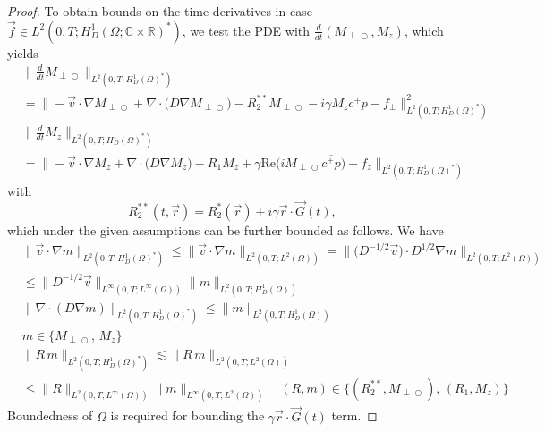 \documentclass{ws-m3as}
\renewcommand\Re{\mathrm{Re}}
\def\Mpp{M_{\perp\!\!\!\!\!\bigcirc}}
\newcommand{\revision}[1]{{ #1}}
\newcommand{\Margin}[1]{}
\begin{document}
\begin{proof}
To obtain bounds on the time derivatives in case $\revision{\vec{f}}\in L^2(0,T;H_D^1(\Omega;\mathbb{C}\times\mathbb{R})^*)$, we test the PDE with $\frac{d}{dt}(\Mpp,M_z)$, which yields
\[
\begin{aligned}
&\|\frac{d}{dt}\Mpp\|_{L^2(0,T;H_D^1(\Omega)^*)}\\
&=\|-{\vec v}\cdot\nabla \Mpp +\nabla\cdot\bigl(D \nabla \Mpp\bigr) 
-R_2^{**}\Mpp-i\gamma M_zc^+p-f_\perp\|_{L^2(0,T;H_D^1(\Omega)^*)}^2\\    
&\|\frac{d}{dt}M_z\|_{L^2(0,T;H_D^1(\Omega)^*)}\\
&=\|-{\vec v}\cdot\nabla M_z +\nabla\cdot\bigl(D \nabla M_z\bigr) 
-R_1 M_z
+\gamma\Re\bigl(i\Mpp\overline{c^+p}\bigr)-f_z\|_{L^2(0,T;H_D^1(\Omega)^*)}
\end{aligned}
\]
with 
\begin{equation}\label{Rstartstar}
R_2^{**}(t,\vec r)
=R_2^*(\vec r)+i\gamma\vec r \cdot \vec G(t),
\end{equation}
which under the given assumptions can be further bounded as follows.
We have
\[
\begin{aligned}
&\|{\vec v}\cdot\nabla m\|_{L^2(0,T;H_D^1(\Omega)^*)}
\leq\|{\vec v}\cdot\nabla m\|_{L^2(0,T;L^2(\Omega))}
=\|\bigl(D^{-1/2}{\vec v}\bigr)\cdot  D^{1/2}\nabla m\|_{L^2(0,T;L^2(\Omega))}\\
&\leq \|D^{-1/2}{\vec v}\|_{L^\infty(0,T;L^\infty(\Omega))} \|m\|_{L^2(0,T;H_D^1(\Omega))}
\\[1ex] 
&\|\nabla\cdot(D\nabla m)\|_{L^2(0,T;H_D^1(\Omega)^*)}\leq \|m\|_{L^2(0,T;H_D^1(\Omega))}\\ 
&m\in\{\Mpp,\,M_z\}
\end{aligned}
\]
\[
\begin{aligned}
&\|R\,m\|_{L^2(0,T;H_D^1(\Omega)^*)}
\lesssim \|R\,m\|_{L^2(0,T;L^2(\Omega))}\\
&\leq \|R\|_{L^2(0,T;L^\infty(\Omega))} \|m\|_{L^\infty(0,T;L^2(\Omega))}
\quad (R,m)\in\{(R_2^{**},\Mpp),\,(R_1,M_z)\}
\end{aligned}
\]
Boundedness of $\Omega$ is required for bounding the $\gamma\vec r \cdot \vec G(t)$ term.

\Margin{R1 A.}
\end{proof}
\end{document}
